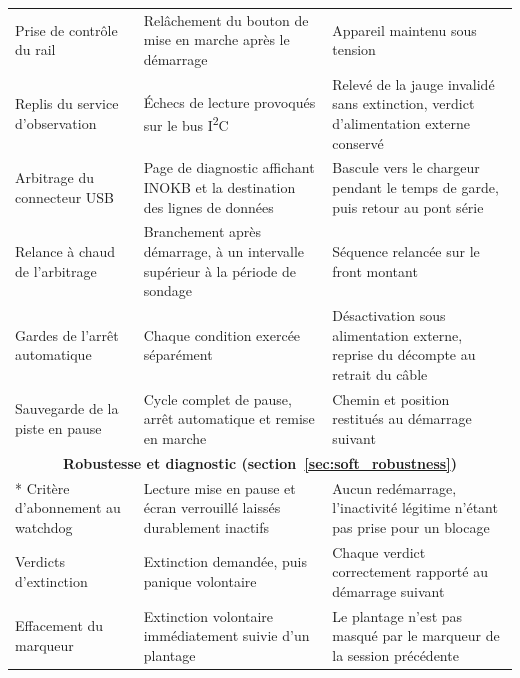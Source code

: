 \begin{longtable}{p{} p{} p{}}
    \hline
    Prise de contrôle du rail                 & Relâchement du bouton de mise en marche après le démarrage                                       & Appareil maintenu sous tension                                                             \\
    Replis du service d'observation           & Échecs de lecture provoqués sur le bus I\textsuperscript{2}C                                     & Relevé de la jauge invalidé sans extinction, verdict d'alimentation externe conservé       \\
    Arbitrage du connecteur USB               & Page de diagnostic affichant INOKB et la destination des lignes de données                       & Bascule vers le chargeur pendant le temps de garde, puis retour au pont série              \\
    Relance à chaud de l'arbitrage            & Branchement après démarrage, à un intervalle supérieur à la période de sondage                   & Séquence relancée sur le front montant                                                     \\
    Gardes de l'arrêt automatique             & Chaque condition exercée séparément                                                              & Désactivation sous alimentation externe, reprise du décompte au retrait du câble           \\
    Sauvegarde de la piste en pause           & Cycle complet de pause, arrêt automatique et remise en marche                                    & Chemin et position restitués au démarrage suivant                                          \\
    \hline
    \multicolumn{3}{c}{\textbf{Robustesse et diagnostic (section~\ref{sec:soft_robustness})}}                                                                                                                                                 \\*
    \hline
    Critère d'abonnement au watchdog          & Lecture mise en pause et écran verrouillé laissés durablement inactifs                           & Aucun redémarrage, l'inactivité légitime n'étant pas prise pour un blocage                 \\
    Verdicts d'extinction                     & Extinction demandée, puis panique volontaire                                                     & Chaque verdict correctement rapporté au démarrage suivant                                  \\
    Effacement du marqueur                    & Extinction volontaire immédiatement suivie d'un plantage                                         & Le plantage n'est pas masqué par le marqueur de la session précédente                      \\

\end{longtable}

